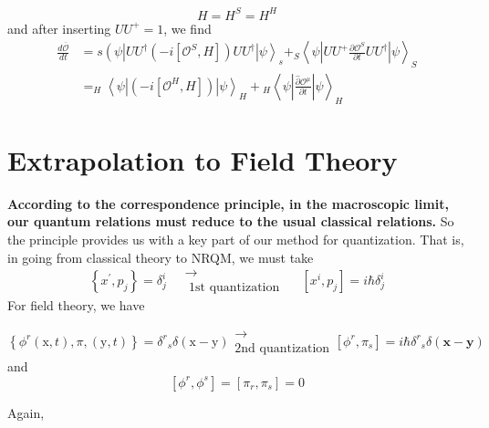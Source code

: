 \begin{equation}
    H=H^S=H^H
\end{equation}
and after inserting $UU^+=1$, we find
\begin{equation}
\begin{aligned}
\frac{d \overline{\mathcal{O}}}{d t} &=s\left(\psi\left|U U^{\dagger}\left(-i\left[\mathcal{O}^{S}, H\right]\right) U U^{\dagger}\right| \psi\right\rangle_{s}+_{S}\left\langle\psi\left|U U^{+} \frac{\partial \mathcal{O}^{S}}{\partial t} U U^{\dagger}\right| \psi\right\rangle_{S} \\
&=_{H}\left\langle\psi\left|\left(-i\left[\mathcal{O}^{H}, H\right]\right)\right| \psi\right\rangle_{H}+{}_{H}\left\langle\psi\left|\frac{\hat{\partial} \mathcal{O}^{\mu}}{\partial t}\right| \psi\right\rangle_{H}
\end{aligned}
\end{equation}
\section{Extrapolation to Field Theory}
\textbf{According to the correspondence principle, in the macroscopic limit, our quantum relations must reduce to the usual classical relations.} So the principle provides us with a key part of our method for quantization. That is, in going from classical theory to NRQM, we must take
$$\left\{x^{\prime}, p_{j}\right\}=\delta_{j}^{i} \quad \substack{\longrightarrow\\ \text { 1st quantization }} \quad\left[x^{i}, p_{j}\right]=i \hbar \delta_{j}^{i}$$
For field theory, we have
\begin{qt}
\begin{equation}
\left\{\phi^{r}(\mathrm{x}, t), \pi,(\mathrm{y}, t)\right\}=\delta^{r}{ }_s \delta(\mathrm{x}-\mathrm{y})\substack{\longrightarrow\\ \text{2nd quantization}}\left[\phi^{r}, \pi_{s}\right]=i \hbar \delta^{r}{ }_s \delta(\mathbf{x}-\mathbf{y}) 
\label{2nd-quantization-commutator}
\end{equation}
and
\begin{equation}
    \left[\phi^{r}, \phi^{s}\right]=\left[\pi_{r}, \pi_{s}\right]=0
\end{equation}
\end{qt}
Again, 

